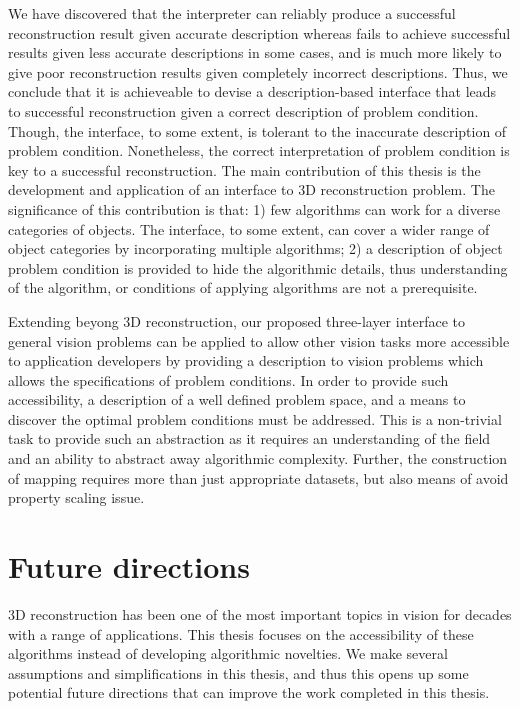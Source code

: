 We have discovered that the interpreter can reliably produce a successful reconstruction result given accurate description whereas fails to achieve successful results given less accurate descriptions in some cases, and is much more likely to give poor reconstruction results given completely incorrect descriptions. Thus, we conclude that it is achieveable to devise a description-based interface that leads to successful reconstruction given a correct description of problem condition. Though, the interface, to some extent, is tolerant to the inaccurate description of problem condition. Nonetheless, the correct interpretation of problem condition is key to a successful reconstruction. The main contribution of this thesis is the development and application of an interface to 3D reconstruction problem. The significance of this contribution is that: 1) few algorithms can work for a diverse categories of objects. The interface, to some extent, can cover a wider range of object categories by incorporating multiple algorithms; 2) a description of object problem condition is provided to hide the algorithmic details, thus understanding of the algorithm, or conditions of applying algorithms are not a prerequisite.

Extending beyong 3D reconstruction, our proposed three-layer interface to general vision problems can be applied to allow other vision tasks more accessible to application developers by providing a description to vision problems which allows the specifications of problem conditions. In order to provide such accessibility, a description of a well defined problem space, and a means to discover the optimal problem conditions must be addressed. This is a non-trivial task to provide such an abstraction as it requires an understanding of the field and an ability to abstract away algorithmic complexity. Further, the construction of mapping requires more than just appropriate datasets, but also means of avoid property scaling issue.

\section{Future directions}
3D reconstruction has been one of the most important topics in vision for decades with a range of applications. This thesis focuses on the accessibility of these algorithms instead of developing algorithmic novelties. We make several assumptions and simplifications in this thesis, and thus this opens up some potential future directions that can improve the work completed in this thesis.

